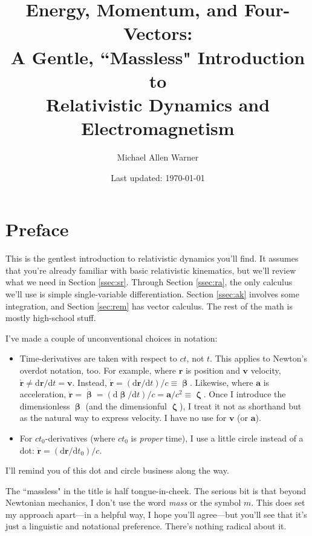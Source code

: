 \documentclass[12pt]{article}
\renewcommand{\vv}[1]{\mathbf{#1}}
\newcommand{\dd}[1]{\mathrm{d}#1}
\newcommand{\vvbeta}{\bm{\upbeta}}
\newcommand{\vvzeta}{\bm{\upzeta}}
\begin{document}
\title{Energy, Momentum, and Four-Vectors:\\A Gentle, ``Massless" Introduction to\\Relativistic Dynamics and Electromagnetism}
\author{Michael Allen Warner}
\date{Last updated: \today}
\maketitle

\section*{Preface}\label{sec:p}

This is the gentlest introduction to relativistic dynamics you'll find. It assumes that you're already familiar with basic relativistic kinematics, but we'll review what we need in Section \ref{ssec:sr}. Through Section \ref{ssec:ra}, the only calculus we'll use is simple single-variable differentiation. Section \ref{ssec:ak} involves some integration, and Section \ref{sec:rem} has vector calculus. The rest of the math is mostly high-school stuff.

I've made a couple of unconventional choices in notation:
\begin{itemize}
\item Time-derivatives are taken with respect to $ct$, not $t$. This applies to Newton's overdot notation, too. For example, where $\vv r$ is position and $\vv v$ velocity, $\dot{\vv r} \neq \dd \vv r / \dd t = \vv v$. Instead, $\dot{\vv r} = (\dd \vv r / \dd t)/c \equiv \vvbeta$. Likewise, where $\vv a$ is acceleration, $\ddot{\vv r} = \dot{\vvbeta} = (\dd \vvbeta / \dd t)/c = \vv a / c^2 \equiv \vvzeta$. Once I introduce the dimensionless $\vvbeta$ (and the dimensionful $\vvzeta$), I treat it not as shorthand but as the natural way to express velocity. I have no use for $\vv v$ (or $\vv a$).
\item For $c t_0$-derivatives (where $ct_0$ is \emph{proper} time), I use a little circle instead of a dot: $\mathring{\vv r} = (\dd \vv r / \dd t_0)/c$.
\end{itemize}
I'll remind you of this dot and circle business along the way.

The ``massless" in the title is half tongue-in-cheek. The serious bit is that beyond Newtonian mechanics, I don't use the word \emph{mass} or the symbol $m$. This does set my approach apart---in a helpful way, I hope you'll agree---but you'll see that it's just a linguistic and notational preference. There's nothing radical about it.
\end{document}
